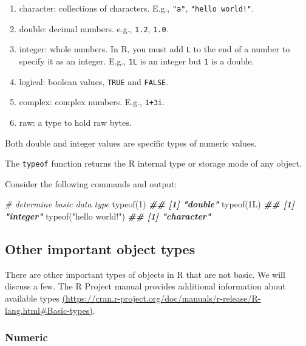 \documentclass[
]{book}
\newenvironment{Shaded}{\begin{snugshade}}{\end{snugshade}}
\newcommand{\CommentTok}[1]{\textcolor[rgb]{0.56,0.35,0.01}{\textit{#1}}}
\newcommand{\DecValTok}[1]{\textcolor[rgb]{0.00,0.00,0.81}{#1}}
\newcommand{\DocumentationTok}[1]{\textcolor[rgb]{0.56,0.35,0.01}{\textbf{\textit{#1}}}}
\newcommand{\FunctionTok}[1]{\textcolor[rgb]{0.00,0.00,0.00}{#1}}
\newcommand{\NormalTok}[1]{#1}
\newcommand{\StringTok}[1]{\textcolor[rgb]{0.31,0.60,0.02}{#1}}
\providecommand{\tightlist}{%
  \setlength{\itemsep}{0pt}\setlength{\parskip}{0pt}}
\theoremstyle{definition}
\theoremstyle{definition}
\theoremstyle{definition}
\theoremstyle{definition}
\theoremstyle{remark}
\begin{document}
\begin{enumerate}
\def\labelenumi{\arabic{enumi}.}
\tightlist
\item
  character: collections of characters. E.g., \texttt{"a"}, \texttt{"hello\ world!"}.
\item
  double: decimal numbers. e.g., \texttt{1.2}, \texttt{1.0}.
\item
  integer: whole numbers. In R, you must add \texttt{L} to the end of a number to specify it as an integer. E.g., \texttt{1L} is an integer but \texttt{1} is a double.
\item
  logical: boolean values, \texttt{TRUE} and \texttt{FALSE}.
\item
  complex: complex numbers. E.g., \texttt{1+3i}.
\item
  raw: a type to hold raw bytes.
\end{enumerate}

Both double and integer values are specific types of numeric values.

The \texttt{typeof} function returns the R internal type or storage mode of any object.

Consider the following commands and output:

\begin{Shaded}
\begin{Highlighting}[]
\CommentTok{\# determine basic data type}
\FunctionTok{typeof}\NormalTok{(}\DecValTok{1}\NormalTok{)}
\DocumentationTok{\#\# [1] "double"}
\FunctionTok{typeof}\NormalTok{(1L)}
\DocumentationTok{\#\# [1] "integer"}
\FunctionTok{typeof}\NormalTok{(}\StringTok{"hello world!"}\NormalTok{)}
\DocumentationTok{\#\# [1] "character"}
\end{Highlighting}
\end{Shaded}

\hypertarget{other-important-object-types}{%
\subsection{Other important object types}\label{other-important-object-types}}

There are other important types of objects in R that are not basic. We will discuss a few. The R Project manual provides additional information about available types \href{https://cran.r-project.org/doc/manuals/r-release/R-lang.html\#Basic-types}{(https://cran.r-project.org/doc/manuals/r-release/R-lang.html\#Basic-types)}.

\hypertarget{numeric}{%
\subsubsection{Numeric}\label{numeric}}
\end{document}
